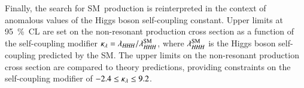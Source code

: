 \documentclass[fontsize=11pt, paper=a4]{scrartcl}
\begin{document}
Finally, the search for SM~\HH production is reinterpreted in the context of
anomalous values of the Higgs boson self-coupling constant. Upper limits at
\SI{95}{\percent}~CL are set on the non-resonant \HH production cross section as
a function of the self-coupling modifier
$\kappa_{\lambda} = \lambda_{H\mkern-1.5muH\mkern-1.5muH} / \lambda_{H\mkern-1.5muH\mkern-1.5muH}^{\text{SM}}$, where $\lambda_{H\mkern-1.5muH\mkern-1.5muH}^{\text{SM}}$
is the Higgs boson self-coupling predicted by the SM. The upper limits on the
non-resonant \HH production cross section are compared to theory predictions,
providing constraints on the self-coupling modifier of
$\num{-2.4} \leq \kappa_{\lambda} \leq 9.2$.
\end{document}
